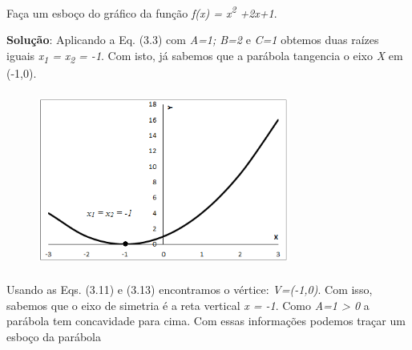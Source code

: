 \begin{texemplo}
Faça um esboço do gráfico da função \textit{f(x) = x\textsuperscript{2} +2x+1}. 

\textbf{Solução}: Aplicando a Eq. (3.3) com \textit{A=1; B=2 }e\textit{ C=1 } obtemos duas raízes iguais   \textit{x\textsubscript{1} = }  \textit{x\textsubscript{2} = -1}. Com isto, já sabemos que a parábola tangencia o eixo \textit{X} em (-1,0). 

\begin{figure}[H]
	\begin{Center}
		\includegraphics[width=3.26in,height=2.27in]{capitulos/funcao_do_segundo_grau/media/image7.png}
	\end{Center}
\end{figure}

Usando as Eqs. (3.11) e (3.13) encontramos o vértice: \textit{V=(-1,0)}. Com isso, sabemos que o eixo de simetria é a reta vertical  \textit{x = -1}. Como \textit{A=1 > 0} a parábola tem concavidade para cima. Com essas informações podemos traçar um esboço da parábola \qedsymbol{}
\end{texemplo}

